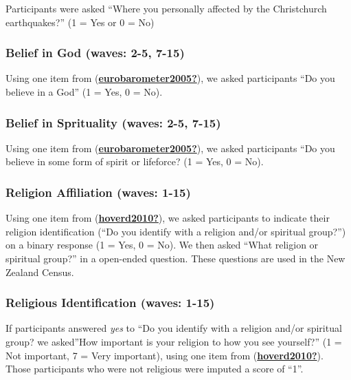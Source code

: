 \documentclass[
  singlecolumn]{report}
\begin{document}
Participants were asked ``Where you personally affected by the
Christchurch earthquakes?'' (1 = Yes or 0 = No)

\hypertarget{belief-in-god-waves-2-5-7-15}{%
\subsubsection{Belief in God (waves: 2-5,
7-15)}\label{belief-in-god-waves-2-5-7-15}}

Using one item from
(\protect\hyperlink{ref-eurobarometer2005}{\textbf{eurobarometer2005?}}),
we asked participants ``Do you believe in a God'' (1 = Yes, 0 = No).

\hypertarget{belief-in-sprituality-waves-2-5-7-15}{%
\subsubsection{Belief in Sprituality (waves: 2-5,
7-15)}\label{belief-in-sprituality-waves-2-5-7-15}}

Using one item from
(\protect\hyperlink{ref-eurobarometer2005}{\textbf{eurobarometer2005?}}),
we asked participants ``Do you believe in some form of spirit or
lifeforce? (1 = Yes, 0 = No).

\hypertarget{religion-affiliation-waves-1-15}{%
\subsubsection{Religion Affiliation (waves:
1-15)}\label{religion-affiliation-waves-1-15}}

Using one item from
(\protect\hyperlink{ref-hoverd2010}{\textbf{hoverd2010?}}), we asked
participants to indicate their religion identification (``Do you
identify with a religion and/or spiritual group?'') on a binary response
(1 = Yes, 0 = No). We then asked ``What religion or spiritual group?''
in a open-ended question. These questions are used in the New Zealand
Census.

\hypertarget{religious-identification-waves-1-15}{%
\subsubsection{Religious Identification (waves:
1-15)}\label{religious-identification-waves-1-15}}

If participants answered \emph{yes} to ``Do you identify with a religion
and/or spiritual group? we asked''How important is your religion to how
you see yourself?'' (1 = Not important, 7 = Very important), using one
item from (\protect\hyperlink{ref-hoverd2010}{\textbf{hoverd2010?}}).
Those participants who were not religious were imputed a score of ``1''.
\end{document}
